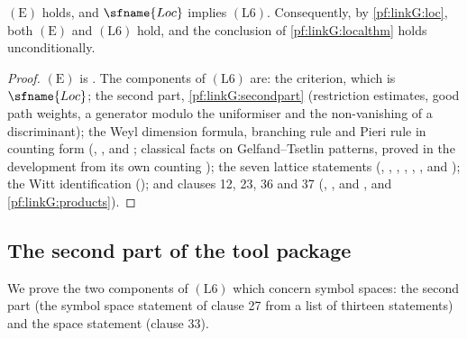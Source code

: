 \begin{proposition}\label{pf:linkG:locmodel}
$(\mathrm E)$ holds, and $\sfname{Loc}$ implies $(\mathrm L6)$. Consequently, by \cref{pf:linkG:loc}, both $(\mathrm E)$
and $(\mathrm L6)$ hold, and the conclusion of \cref{pf:linkG:localthm} holds unconditionally.
\end{proposition}

\begin{proof}
$(\mathrm E)$ is . The components of
$(\mathrm L6)$ are: the criterion, which is $\sfname{Loc}$; the second part,
\cref{pf:linkG:secondpart} (restriction estimates, good path weights, a
generator modulo the uniformiser and the non-vanishing of a discriminant); the Weyl dimension formula, branching rule
and Pieri rule in counting form
(, , and ;
classical facts on Gelfand--Tsetlin patterns, proved in the development from its own counting
\cite{GelfandTsetlin1950,FultonHarris1991}); the seven lattice statements
(, , , , , , and );
the Witt identification (); and clauses 12, 23, 36 and 37
(, , and ,
and \cref{pf:linkG:products}).
\end{proof}

\subsection{The second part of the tool package}\label{sec:pf:linkG:second}

We prove the two components of $(\mathrm L6)$ which concern symbol spaces: the second part (the symbol space statement of
clause 27 from a list of thirteen statements) and the space statement (clause 33).

